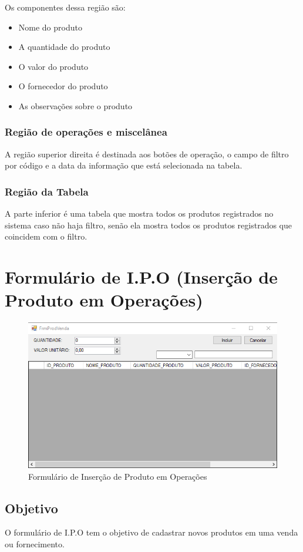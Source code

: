 \documentclass[
	article,			%
	12pt,				%
	oneside,			%
	a4paper,			%
	english,			%
	brazil,				%
	sumario=tradicional
	]{abntex2}
\begin{document}
			Os componentes dessa região são:
			\begin{itemize}\itemsep1.5pt
				\item Nome do produto
				\item A quantidade do produto
				\item O valor do produto
				\item O fornecedor do produto
				\item As observações sobre o produto
			\end{itemize}	
			\subsubsection{Região de operações e miscelânea}
			A região superior direita é destinada aos botões de operação, o campo de filtro por código e a data da informação que está selecionada na tabela.
			\subsubsection{Região da Tabela}
			A parte inferior é uma tabela que mostra todos os produtos registrados no sistema caso não haja filtro, senão ela mostra todos os produtos registrados que coincidem com o filtro.
\newpage
	\section{Formulário de I.P.O (Inserção de Produto em Operações)}
		\begin{figure}[!htb]
			\centering
			\includegraphics[scale=0.9]{./Figuras/FrmProdVenda.png}
			\caption{Formulário de Inserção de Produto em Operações}
		\end{figure}
		\subsection{Objetivo}
		O formulário de I.P.O tem o objetivo de cadastrar novos produtos em uma venda ou fornecimento.
\end{document}

